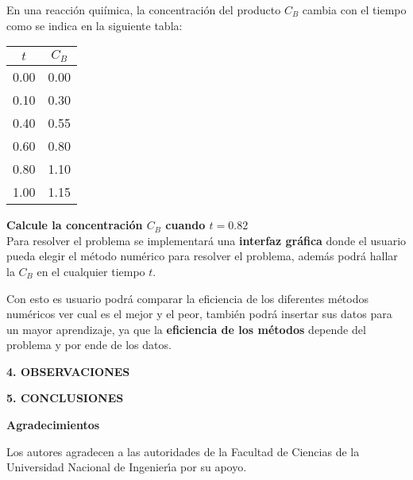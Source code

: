 \documentclass[10pt,a4paper]{article}
\begin{document}
\begin{multicols}{2}
\begin{center}
\end{center}

\noindent En una reacción quiímica, la concentración del producto $C_B$ cambia con el tiempo como se indica en la siguiente tabla:


\begin{center}
	\begin{tabular}{ |c|c| }
		\hline
		$t$ & $C_B$ \\ \hline
		0.00 & 0.00 \\ \hline
		0.10 & 0.30 \\ \hline
		0.40 & 0.55 \\ \hline
		0.60 & 0.80 \\ \hline
		0.80 & 1.10 \\ \hline
		1.00 & 1.15 \\ \hline
	\end{tabular}
\end{center}

\textbf{Calcule la concentración $C_B$ cuando $t = 0.82$}\\

		
\noindent Para resolver el problema se implementará una \textbf{interfaz gráfica} donde el usuario pueda elegir el método numérico para resolver el problema, además podrá hallar la $C_B$ en el cualquier tiempo $t$.  

\noindent Con esto es usuario podrá comparar la eficiencia de los diferentes métodos numéricos ver cual es el mejor y el peor, también podrá insertar sus datos para un mayor aprendizaje, ya que la \textbf{eficiencia de los métodos} depende del problema y por ende de los datos.

\begin{center}
{\large \bf 4. OBSERVACIONES}
\end{center}

\begin{center}
{\large \bf 5. CONCLUSIONES}
\end{center}

\begin{center}
{\large \bf Agradecimientos}
\end{center}
Los autores agradecen a las autoridades de la Facultad de Ciencias de la Universidad Nacional de 
Ingenier\'{\i}a por su apoyo.

\end{multicols}
\newpage
\end{document}
